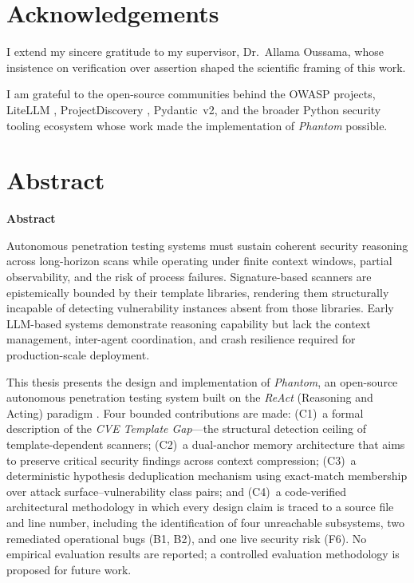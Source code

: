 \documentclass[12pt, a4paper, oneside, openany]{book}
\newcommand{\Phant}{\textit{Phantom}}
\begin{document}
\chapter*{Acknowledgements}

I extend my sincere gratitude to my supervisor, Dr.\ Allama Oussama,
whose insistence on verification over assertion shaped the scientific
framing of this work.

I am grateful to the open-source communities behind the OWASP projects,
LiteLLM \citep{litellm2023}, ProjectDiscovery \citep{projectdiscovery_nuclei},
Pydantic~v2, and the broader Python security tooling ecosystem whose
work made the implementation of \Phant{} possible.

\cleardoublepage

\chapter*{Abstract}
\vspace{0.5cm}
\begin{center}
\textbf{\Large Abstract}
\end{center}
\vspace{0.5cm}

Autonomous penetration testing systems must sustain coherent security
reasoning across long-horizon scans while operating under finite context
windows, partial observability, and the risk of process failures.
Signature-based scanners are epistemically bounded by their template
libraries, rendering them structurally incapable of detecting
vulnerability instances absent from those libraries.  Early LLM-based
systems demonstrate reasoning capability but lack the context
management, inter-agent coordination, and crash resilience required
for production-scale deployment.

This thesis presents the design and implementation of \Phant{}, an
open-source autonomous penetration testing system built on the
\textit{ReAct} (Reasoning and Acting) paradigm \citep{yao2023react}.
Four bounded contributions are made: (C1)~a formal description of
the \textit{CVE Template Gap}---the structural detection ceiling of
template-dependent scanners; (C2)~a dual-anchor memory architecture
that aims to preserve critical security findings across context
compression; (C3)~a deterministic hypothesis deduplication mechanism
using exact-match membership over attack surface--vulnerability class
pairs; and (C4)~a code-verified architectural methodology in which
every design claim is traced to a source file and line number,
including the identification of four unreachable subsystems, two
remediated operational bugs (B1, B2), and one live security risk (F6).
No empirical evaluation results are reported; a controlled evaluation
methodology is proposed for future work.
\end{document}
